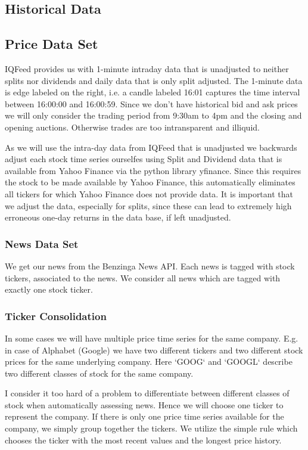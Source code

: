 \documentclass[12pt,a4paper]{article}
\begin{document}
	\subsection{Historical Data}
	
	\subsection{Price Data Set}
	IQFeed provides us with 1-minute intraday data that is unadjusted to neither splits nor dividends and daily data that is only split adjusted. 
	The 1-minute data is edge labeled on the right, i.e. a candle labeled 16:01 captures the time interval between 16:00:00 and 16:00:59.
	Since we don't have historical bid and ask prices we will only consider the trading period from 9:30am to 4pm and the closing and opening auctions.
	Otherwise trades are too intransparent and illiquid.
	
	As we will use the intra-day data from IQFeed that is unadjusted we backwards adjust each stock time series ourselfes using Split and Dividend data that is available from Yahoo Finance via the python library yfinance.
	Since this requires the stock to be made available by Yahoo Finance, this automatically eliminates all tickers for which Yahoo Finance does not provide data.
	It is important that we adjust the data, especially for splits, since these can lead to extremely high erroneous one-day returns in the data base, if left unadjusted.
	

	\subsubsection{News Data Set}
	We get our news from the Benzinga News API.
	Each news is tagged with stock tickers, associated to the news.
	We consider all news which are tagged with exactly one stock ticker.
	
	\subsubsection{Ticker Consolidation}
	In some cases we will have multiple price time series for the same company.
	E.g. in case of Alphabet (Google) we have two different tickers and two different stock prices for the same underlying company. 
	Here `GOOG` and `GOOGL` describe two different classes of stock for the same company.
	
	I consider it too hard of a problem to differentiate between different classes of stock when automatically assessing news.
	Hence we will choose one ticker to represent the company.
	If there is only one price time series available for the company, we simply group together the tickers.
	We utilize the simple rule which chooses the ticker with the most recent values and the longest price history.
	
\end{document}
